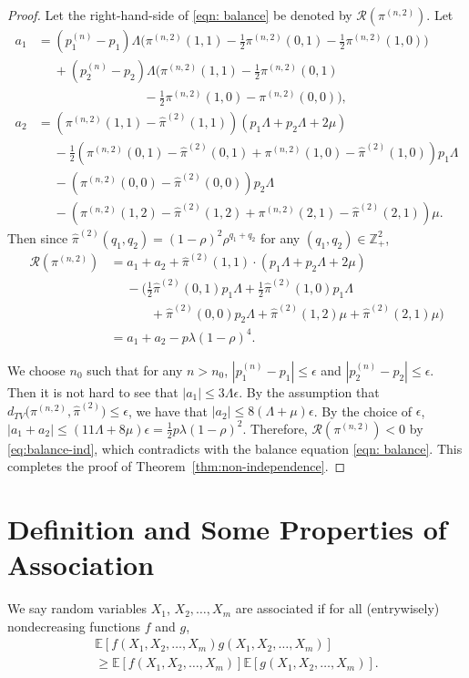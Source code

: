 \documentclass[sigconf]{acmart}
\newcommand{\expect}{\mathbb{E}} %
\newcommand{\supn}{^{(n)}}
\begin{document}
\begin{proof}
Let the right-hand-side of \eqref{eqn: balance} be denoted by $\mathcal{R}(\pi^{(n,2)})$. Let
\begin{align*}
a_1&=(p_1\supn-p_1)\Lambda\biggl(\pi^{(n,2)}(1,1)-\frac{1}{2}\pi^{(n,2)}(0,1)-\frac{1}{2}\pi^{(n,2)}(1,0)\biggr)\\
&\mspace{23mu}+(p_2\supn-p_2)\Lambda\biggl(\pi^{(n,2)}(1,1)-\frac{1}{2}\pi^{(n,2)}(0,1)\\
&\mspace{150mu}-\frac{1}{2}\pi^{(n,2)}(1,0)-\pi^{(n,2)}(0,0)\biggr),\\
a_2&=(\pi^{(n,2)}(1,1)-\hat{\pi}^{(2)}(1,1))(p_1\Lambda+p_2\Lambda+2\mu)\\
&\mspace{23mu}-\frac{1}{2}(\pi^{(n,2)}(0,1)-\hat{\pi}^{(2)}(0,1)+\pi^{(n,2)}(1,0)-\hat{\pi}^{(2)}(1,0))p_1\Lambda\\
&\mspace{23mu}-(\pi^{(n,2)}(0,0)-\hat{\pi}^{(2)}(0,0))p_2\Lambda\\
&\mspace{23mu}-(\pi^{(n,2)}(1,2)-\hat{\pi}^{(2)}(1,2)+\pi^{(n,2)}(2,1)-\hat{\pi}^{(2)}(2,1))\mu.
\end{align*}
Then since $\hat{\pi}^{(2)}(q_1,q_2)=(1-\rho)^2\rho^{q_1+q_2}$ for any $(q_1,q_2)\in\mathbb{Z}_+^2$,
\begin{align}
\mathcal{R}(\pi^{(n,2)})&=a_1+a_2+\hat{\pi}^{(2)}(1,1) \cdot (p_1\Lambda+p_2\Lambda+2\mu)\nonumber\\
&\mspace{23mu}-\biggl(\frac{1}{2}\hat{\pi}^{(2)}(0,1)p_1\Lambda+\frac{1}{2}\hat{\pi}^{(2)}(1,0)p_1\Lambda\nonumber\\
&\mspace{57mu}+\hat{\pi}^{(2)}(0,0)p_2\Lambda+\hat{\pi}^{(2)}(1,2)\mu+\hat{\pi}^{(2)}(2,1)\mu\biggr)\nonumber\\
&=a_1+a_2-p \lambda(1-\rho)^4.\label{eq:balance-ind}
\end{align}

We choose $n_0$ such that for any $n> n_0$, $|p_1\supn-p_1|\le \epsilon$ and $|p_2\supn-p_2|\le \epsilon$.  Then it is not hard to see that $|a_1|\le 3\Lambda\epsilon$.  By the assumption that $d_{TV}\bigl(\pi^{(n,2)},\hat{\pi}^{(2)}\bigr)\le \epsilon$, we have that $|a_2|\le8(\Lambda+\mu) \epsilon$. By the choice of $\epsilon$, $|a_1+a_2|\le (11\Lambda+8\mu)\epsilon=\frac{1}{2}p\lambda(1-\rho)^2$.  Therefore, $\mathcal{R}(\pi^{(n,2)})<0$ by \eqref{eq:balance-ind}, which contradicts with the balance equation \eqref{eqn: balance}.  This completes the proof of Theorem~\ref{thm:non-independence}.
\end{proof}


\section{Definition and Some Properties of Association}\label{app:association}
\begin{definition}
We say random variables $X_1$, $X_2,\dots,X_m$ are associated if for all (entrywisely) nondecreasing functions $f$ and $g$,
\begin{multline}
\expect[f(X_1,X_2,\dots,X_m)g(X_1,X_2,\dots,X_m)]\\
\ge \expect[f(X_1,X_2,\dots,X_m)]\expect[g(X_1,X_2,\dots,X_m)].
\end{multline}
\end{definition}
\end{document}
